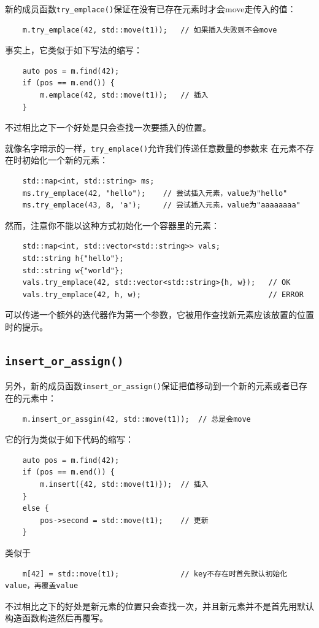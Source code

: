 新的成员函数\texttt{try\_emplace()}保证在没有已存在元素时才会move走传入的值：
\begin{lstlisting}
    m.try_emplace(42, std::move(t1));   // 如果插入失败则不会move
\end{lstlisting}
事实上，它类似于如下写法的缩写：
\begin{lstlisting}
    auto pos = m.find(42);
    if (pos == m.end()) {
        m.emplace(42, std::move(t1));   // 插入
    }
\end{lstlisting}
不过相比之下一个好处是只会查找一次要插入的位置。

就像名字暗示的一样，\texttt{try\_emplace()}允许我们传递任意数量的参数来
在元素不存在时初始化一个新的元素：
\begin{lstlisting}
    std::map<int, std::string> ms;
    ms.try_emplace(42, "hello");    // 尝试插入元素，value为"hello"
    ms.try_emplace(43, 8, 'a');     // 尝试插入元素，value为"aaaaaaaa"
\end{lstlisting}
然而，注意你不能以这种方式初始化一个容器里的元素：
\begin{lstlisting}
    std::map<int, std::vector<std::string>> vals;
    std::string h{"hello"};
    std::string w{"world"};
    vals.try_emplace(42, std::vector<std::string>{h, w});   // OK
    vals.try_emplace(42, h, w);                             // ERROR
\end{lstlisting}
可以传递一个额外的迭代器作为第一个参数，它被用作查找新元素应该放置的位置时的提示。

\subsection{\texttt{insert\_or\_assign()}}
另外，新的成员函数\texttt{insert\_or\_assign()}保证把值移动到一个新的元素或者已存在的元素中：
\begin{lstlisting}
    m.insert_or_assgin(42, std::move(t1));  // 总是会move
\end{lstlisting}
它的行为类似于如下代码的缩写：
\begin{lstlisting}
    auto pos = m.find(42);
    if (pos == m.end()) {
        m.insert({42, std::move(t1)});  // 插入
    }
    else {
        pos->second = std::move(t1);    // 更新
    }
\end{lstlisting}
类似于
\begin{lstlisting}
    m[42] = std::move(t1);              // key不存在时首先默认初始化value，再覆盖value
\end{lstlisting}
不过相比之下的好处是新元素的位置只会查找一次，并且新元素并不是首先用默认构造函数构造然后再覆写。


